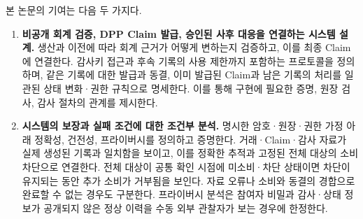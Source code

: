 본 논문의 기여는 다음 두 가지다.
\begin{enumerate}
    \item \textbf{비공개 회계 검증, DPP Claim 발급, 승인된 사후 대응을 연결하는 시스템 설계.}
          생산과 이전에 따라 회계 근거가 어떻게 변하는지 검증하고, 이를 최종 Claim에 연결한다.
          감사키 접근과 후속 기록의 사용 제한까지 포함하는 프로토콜을 정의하며, 같은 기록에 대한 발급과 동결, 이미 발급된 Claim과 남은 기록의 처리를 일관된 상태 변화·권한 규칙으로 명세한다.
          이를 통해 구현에 필요한 증명, 원장 검사, 감사 절차의 관계를 제시한다.
    \item \textbf{시스템의 보장과 실패 조건에 대한 조건부 분석.}
          명시한 암호·원장·권한 가정 아래 정확성, 건전성, 프라이버시를 정의하고 증명한다.
          거래·Claim·감사 자료가 실제 생성된 기록과 일치함을 보이고, 이를 정확한 추적과 고정된 전체 대상의 소비 차단으로 연결한다.
          전체 대상이 공통 확인 시점에 미소비·차단 상태이면 차단이 유지되는 동안 추가 소비가 거부됨을 보인다.
          자료 오류나 소비와 동결의 경합으로 완료할 수 없는 경우도 구분한다.
          프라이버시 분석은 참여자 비밀과 감사·상태 정보가 공개되지 않은 정상 이력을 수동 외부 관찰자가 보는 경우에 한정한다.
\end{enumerate}
